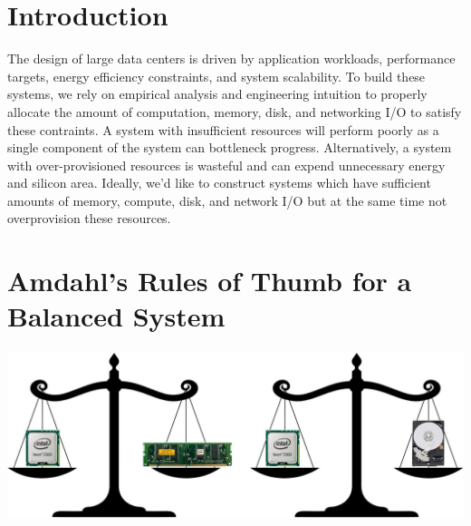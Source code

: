 \documentclass[a0,portrait]{a0poster}
\begin{document}
\vspace{1cm} %


\begin{multicols}{2} %


\color{Navy} %

\section{Introduction}

The design of large data centers is driven by application workloads, performance targets, energy efficiency constraints, and system scalability.
To build these systems, we rely on empirical analysis and engineering intuition to properly allocate the amount of computation, memory, disk, and networking I/O to satisfy these contraints.
A system with insufficient resources will perform poorly as a single component of the system can bottleneck progress.
Alternatively, a system with over-provisioned resources is wasteful and can expend unnecessary energy and silicon area.
Ideally, we'd like to construct systems which have sufficient amounts of memory, compute, disk, and network I/O but at the same time not overprovision these resources.


\color{SaddleBrown} %

\section*{Amdahl's Rules of Thumb for a Balanced System}

\begin{center}\vspace{1cm}
\includegraphics[width=0.8\linewidth]{balance_fig.jpg}
\end{center}\vspace{1cm}


\end{multicols}
\end{document}
